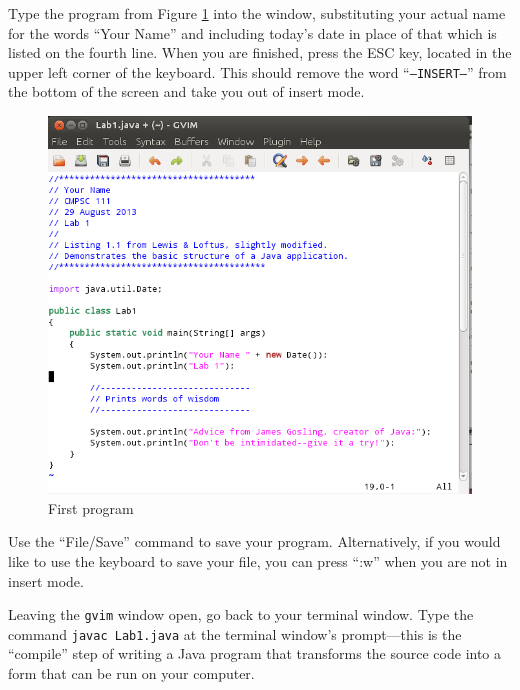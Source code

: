 Type the program from Figure \ref{lab1prog} into the window, substituting your actual name for the words ``Your Name''
and including today's date in place of that which is listed on the fourth line. When you are finished, press the ESC
key, located in the upper left corner of the keyboard.  This should remove the word ``{\tt --INSERT--}'' from the bottom
of the screen and take you out of insert mode.

\begin{figure}[htbp]
  \centering
  \includegraphics[width=5.8in]{images/lab1prog}
  \caption{First program}
  \label{lab1prog}
\end{figure}

Use the ``File/Save'' command to save your program. Alternatively, if you would like to use the keyboard to save your
file, you can press ``:w'' when you are not in insert mode.


Leaving the {\tt gvim} window open, go back to your terminal window. Type the command {\tt javac Lab1.java} at the
terminal window's prompt---this is the ``compile'' step of writing a Java program that transforms the source code into a
form that can be run on your computer.

